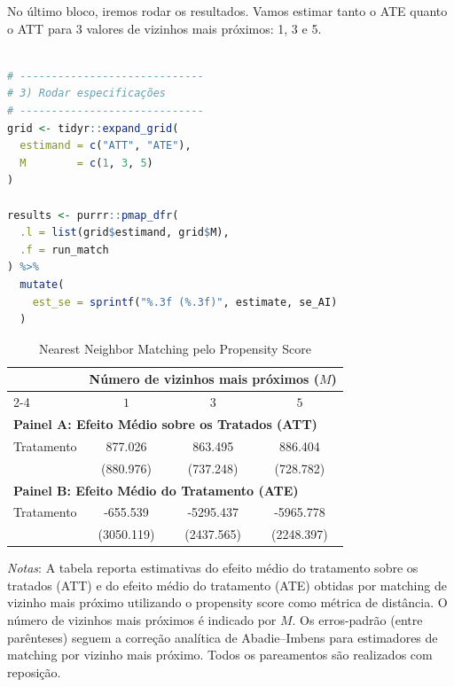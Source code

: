 No último bloco, iremos rodar os resultados. Vamos estimar tanto o ATE quanto o ATT para 3 valores de vizinhos mais próximos: 1, 3 e 5. 

\begin{boxH}
\begin{lstlisting}[language = R]

# -----------------------------
# 3) Rodar especificações
# -----------------------------
grid <- tidyr::expand_grid(
  estimand = c("ATT", "ATE"),
  M        = c(1, 3, 5)
)

results <- purrr::pmap_dfr(
  .l = list(grid$estimand, grid$M),
  .f = run_match
) %>%
  mutate(
    est_se = sprintf("%.3f (%.3f)", estimate, se_AI)
  )

\end{lstlisting}
\end{boxH}

\begin{table}[htbp]
\centering
\caption{Nearest Neighbor Matching pelo Propensity Score}
\label{tab:nn_pscore_panels}
\begin{tabular}{lccc}
\toprule
 & \multicolumn{3}{c}{Número de vizinhos mais próximos ($M$)} \\
\cmidrule(lr){2-4}
 & $1$ & $3$ & $5$ \\
\midrule
\multicolumn{4}{l}{\textbf{Painel A: Efeito Médio sobre os Tratados (ATT)}} \\
\midrule
Tratamento & 877.026 & 863.495 & 886.404 \\
           & (880.976) & (737.248) & (728.782) \\
\midrule
\multicolumn{4}{l}{\textbf{Painel B: Efeito Médio do Tratamento (ATE)}} \\
\midrule
Tratamento & -655.539 & -5295.437 & -5965.778 \\
           & (3050.119) & (2437.565) & (2248.397) \\
\bottomrule
\end{tabular}

\begin{flushleft}
\footnotesize
\textit{Notas}: A tabela reporta estimativas do efeito médio do tratamento sobre os tratados (ATT) e do efeito médio do tratamento (ATE) obtidas por matching de vizinho mais próximo utilizando o propensity score como métrica de distância. O número de vizinhos mais próximos é indicado por $M$. Os erros-padrão (entre parênteses) seguem a correção analítica de Abadie--Imbens para estimadores de matching por vizinho mais próximo. Todos os pareamentos são realizados com reposição.
\end{flushleft}
\end{table}


